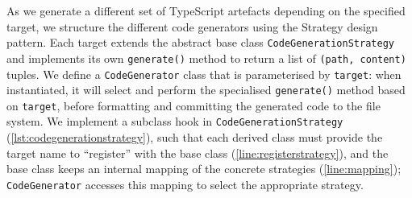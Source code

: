 As we generate a different set of TypeScript artefacts depending
on the specified target, we structure the different code generators
using the Strategy design pattern. 
Each target extends the
abstract base class \texttt{CodeGenerationStrategy} 
and implements its own \texttt{generate()}
method to return a list of \texttt{(path, content)} tuples. 
We define a \texttt{CodeGenerator} class that is parameterised 
by \texttt{target}: when instantiated, it will select and perform 
the specialised \texttt{generate()} method based on \texttt{target}, 
before formatting and committing the generated code 
to the file system.
We implement a subclass hook in \texttt{CodeGenerationStrategy}
(\cref{lst:codegenerationstrategy}),
such that each derived class must provide the target name to
``register'' with the base class (\cref{line:registerstrategy}),
and the base class keeps an internal
mapping of the concrete strategies (\cref{line:mapping}); 
\texttt{CodeGenerator} accesses
this mapping to select the appropriate strategy.
